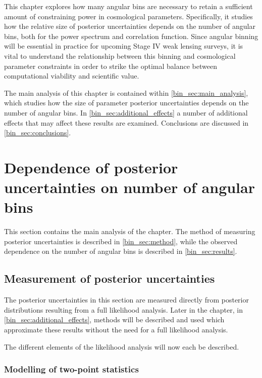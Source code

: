 This chapter explores how many angular bins are necessary to retain a sufficient amount of constraining power in cosmological parameters. Specifically, it studies how the relative size of posterior uncertainties depends on the number of angular bins, both for the power spectrum and correlation function. Since angular binning will be essential in practice for upcoming Stage IV weak lensing surveys, it is vital to understand the relationship between this binning and cosmological parameter constraints in order to strike the optimal balance between computational viability and scientific value.

The main analysis of this chapter is contained within \autoref{bin_sec:main_analysis}, which studies how the size of parameter posterior uncertainties depends on the number of angular bins. In \autoref{bin_sec:additional_effects} a number of additional effects that may affect these results are examined. Conclusions are discussed in \autoref{bin_sec:conclusions}.

\section{Dependence of posterior uncertainties on number of angular bins}
\label{bin_sec:main_analysis}

This section contains the main analysis of the chapter. The method of measuring posterior uncertainties is described in \autoref{bin_sec:method}, while the observed dependence on the number of angular bins is described in \autoref{bin_sec:results}.

\subsection{Measurement of posterior uncertainties}
\label{bin_sec:method}

The posterior uncertainties in this section are measured directly from posterior distributions resulting from a full likelihood analysis. Later in the chapter, in \autoref{bin_sec:additional_effects}, methods will be described and used which approximate these results without the need for a full likelihood analysis.

The different elements of the likelihood analysis will now each be described.

\subsubsection{Modelling of two-point statistics}
\label{bin_sec:modelling}

